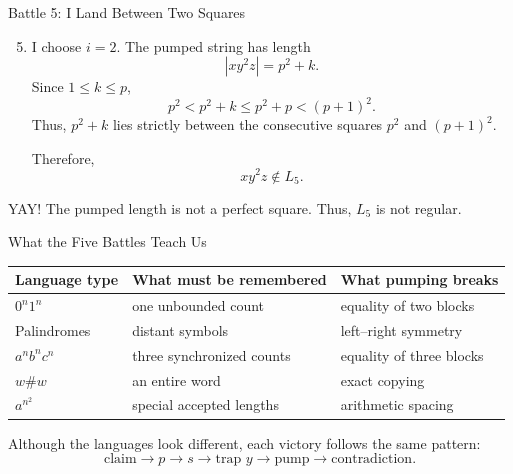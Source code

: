 \documentclass[10pt,aspectratio=169]{beamer}
\begin{document}
\begin{frame}{Battle 5: I Land Between Two Squares}
\small
\begin{enumerate}
    \setcounter{enumi}{4}
    \item I choose $i=2$. The pumped string has length
    \[
    |xy^2z|=p^2+k.
    \]
    Since $1\leq k\leq p$,
    \[
    p^2<p^2+k\leq p^2+p<(p+1)^2.
    \]
    Thus, $p^2+k$ lies strictly between the consecutive squares
    $p^2$ and $(p+1)^2$.

    Therefore,
    \[
    xy^2z\notin L_5.
    \]
\end{enumerate}

\begin{block}{YAY!}
The pumped length is not a perfect square. Thus, $L_5$ is not regular.
\end{block}
\end{frame}

\begin{frame}{What the Five Battles Teach Us}
\small
\begin{center}
\begin{tabular}{lll}
\toprule
\textbf{Language type} & \textbf{What must be remembered} & \textbf{What pumping breaks} \\
\midrule
$0^n1^n$ & one unbounded count & equality of two blocks \\
Palindromes & distant symbols & left--right symmetry \\
$a^nb^nc^n$ & three synchronized counts & equality of three blocks \\
$w\#w$ & an entire word & exact copying \\
$a^{n^2}$ & special accepted lengths & arithmetic spacing \\
\bottomrule
\end{tabular}
\end{center}

\vspace{0.7em}
Although the languages look different, each victory follows the same pattern:
\[
\text{claim}\to p\to s\to\text{trap }y\to\text{pump}\to\text{contradiction}.
\]
\end{frame}
\end{document}
